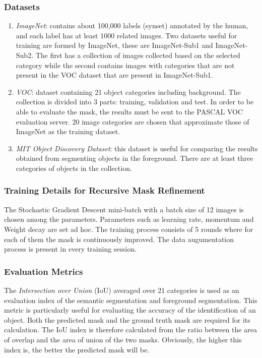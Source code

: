\subsubsection{Datasets}
\begin{enumerate}
    \item \emph{ImageNet}: contains about 100,000 labels (synset) annotated by the 
    human, and each label has at least 1000 related images. Two datasets 
    useful for training are formed by ImageNet, these are ImageNet-Sub1 
    and ImageNet-Sub2. The first has a collection of images collected based 
    on the selected category while the second contains images with categories 
    that are not present in the VOC dataset that are present in 
    ImageNet-Sub1.
    \item \emph{VOC}: dataset containing 21 object categories including background. 
    The collection is divided into 3 parts: training, validation and test. In 
    order to be able to evaluate the mask, the results must be sent to the 
    PASCAL VOC evaluation server. 20 image categories are chosen that 
    approximate those of ImageNet as the training dataset.
    \item \emph{MIT Object Discovery Dataset}: this dataset is useful for comparing the 
    results obtained from segmenting objects in the foreground. There are 
    at least three categories of objects in the collection.
\end{enumerate}

\subsubsection{Training Details for Recursive Mask Refinement}
The Stochastic Gradient Descent mini-batch with a batch size of 12 images 
is chosen among the parameters. Parameters such as learning rate, momentum 
and Weight decay are set ad hoc. The training process consists of 5 
rounds where for each of them the mask is continuously improved. The data 
augumentation process is present in every training session.

\subsubsection{Evaluation Metrics}
The \emph{Intersection over Union} (IoU) averaged over 21 categories is used as an evaluation index of the semantic segmentation and foreground segmentation. This metric is particularly useful for evaluating the accuracy of the identification of an object. Both the predicted mask and the ground truth mask are required for its calculation. The IoU index is therefore calculated from the ratio between the area of overlap and the area of union of the two masks. Obviously, the higher this index is, the better the predicted mask will be.

